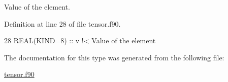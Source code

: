 Value of the element. 



Definition at line 28 of file tensor.\+f90.


\begin{DoxyCode}
28      \textcolor{keywordtype}{REAL(KIND=8)} :: v\textcolor{comment}{ !< Value of the element}
\end{DoxyCode}


The documentation for this type was generated from the following file\+:\begin{DoxyCompactItemize}
\item 
\hyperlink{tensor_8f90}{tensor.\+f90}\end{DoxyCompactItemize}
